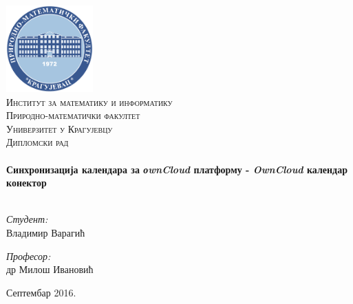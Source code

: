 %
%

\begin{titlepage}

\begin{center}

\includegraphics[width=0.25\textwidth]{logo-pmf.pdf}\\[1cm]

\textsc{\LARGE Институт за математику и информатику
\\ Природно-математички факултет
\\ Универзитет у Крагујевцу}\\[1.5cm]

\textsc{\Large Дипломски рад}\\[0.5cm]

\HRule \\[0.4cm]
{ \huge \bfseries Синхронизација календара за \textit{оwnCloud} платформу - \textit{OwnCloud} календар конектор}\\[0.4cm]

\HRule \\[1.5cm]

\begin{minipage}{0.4\textwidth}
\begin{flushleft} \large
\emph{Студент:}\\
Владимир Варагић
\end{flushleft}
\end{minipage}
\begin{minipage}{0.4\textwidth}
\begin{flushright} \large
\emph{Професор:} \\
др Милош Ивановић
\end{flushright}
\end{minipage}

\vfill

{\large Септембар 2016.}

\end{center}

\end{titlepage}
